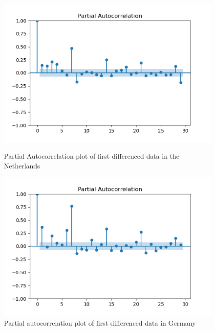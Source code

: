 \begin{figure}
\begin{minipage}{.5\textwidth}
    \centering
    \includegraphics[width=\linewidth]{pics/pacf_1_diff_NL.png}
    \caption{Partial Autocorrelation plot of first differenced data in the Netherlands}
    \label{fig:partial autocorrelation NL}
\end{minipage}
\begin{minipage}{.5\textwidth} 
    \centering
    \includegraphics[width=\linewidth]{pics/pacf_1_diff_DE.png}
    \caption{Partial autocorrelation plot of first differenced data in Germany}
    \label{fig:partial autocorrelation DE}
\end{minipage}
\end{figure}